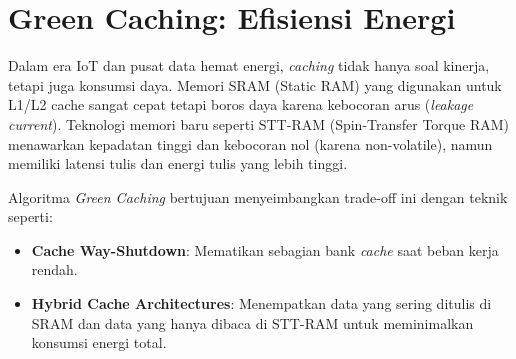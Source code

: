 \section{Green Caching: Efisiensi Energi}
Dalam era IoT dan pusat data hemat energi, \textit{caching} tidak hanya
soal kinerja, tetapi juga konsumsi daya.
Memori SRAM (Static RAM) yang digunakan untuk L1/L2 cache sangat cepat
tetapi boros daya karena kebocoran arus (\textit{leakage current}).
Teknologi memori baru seperti STT-RAM (Spin-Transfer Torque RAM) menawarkan
kepadatan tinggi dan kebocoran nol (karena non-volatile), namun memiliki
latensi tulis dan energi tulis yang lebih tinggi.

Algoritma \textit{Green Caching} bertujuan menyeimbangkan trade-off ini
dengan teknik seperti:
\begin{itemize}
  \item \textbf{Cache Way-Shutdown}: Mematikan sebagian bank \textit{cache}
    saat beban kerja rendah.
  \item \textbf{Hybrid Cache Architectures}: Menempatkan data yang sering
    ditulis di SRAM dan data yang hanya dibaca di STT-RAM untuk meminimalkan
    konsumsi energi total.
\end{itemize}
